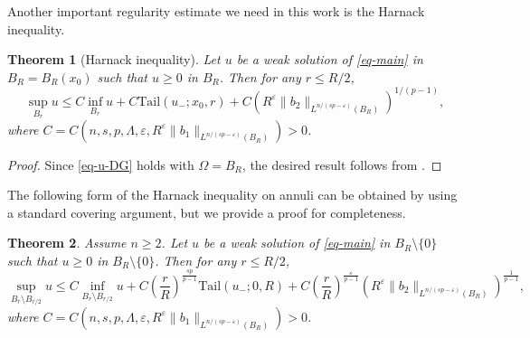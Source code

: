 \documentclass[11pt]{amsart}
\theoremstyle{plain}
\newtheorem{theorem}{Theorem}[section]
\theoremstyle{definition}
\numberwithin{equation}{section}
\begin{document}
Another important regularity estimate we need in this work is the Harnack inequality.

\begin{theorem}[Harnack inequality]\label{thm-harnack}
Let $u$ be a weak solution of \eqref{eq-main} in $B_R=B_R(x_0)$ such that $u \geq 0$ in $B_R$. Then for any $r \leq R/2$,
	\begin{equation*}
		\sup_{B_r}u \leq C \inf_{B_r}u + C \mathrm{Tail}(u_-; x_0, r) + C\left( R^\varepsilon \|b_2\|_{L^{n/(sp-\varepsilon)}(B_R)} \right)^{1/(p-1)},
	\end{equation*}
where $C=C(n, s, p, \Lambda, \varepsilon, R^\varepsilon\|b_1\|_{L^{n/(sp-\varepsilon)}(B_R)})>0$.
\end{theorem}

\begin{proof}
Since \eqref{eq-u-DG} holds with $\Omega=B_R$, the desired result follows from \cite[Theorem~6.9]{Coz17}.
\end{proof}

The following form of the Harnack inequality on annuli can be obtained by using a standard covering argument, but we provide a proof for completeness.

\begin{theorem}\label{thm-Harnack-annulus}
Assume $n \geq 2$. Let $u$ be a weak solution of \eqref{eq-main} in $B_R \setminus \{0\}$ such that $u \geq 0$ in $B_R \setminus \{0\}$. Then for any $r \leq R/2$, 
\begin{equation*}
\sup_{B_r \setminus B_{r/2}}{u} \leq C \inf_{B_r \setminus B_{r/2}}{u} + C \left(\frac{r}{R}\right)^{\frac{sp}{p-1}}\mathrm{Tail}(u_-; 0, R) + C\left(\frac{r}{R}\right)^{\frac{\varepsilon}{p-1}}\left( R^\varepsilon \|b_2\|_{L^{n/(sp-\varepsilon)}(B_R)} \right)^{\frac{1}{p-1}},
\end{equation*}
where $C=C(n, s, p, \Lambda, \varepsilon, R^\varepsilon\|b_1\|_{L^{n/(sp-\varepsilon)}(B_R)})>0$.
\end{theorem}
\end{document}
